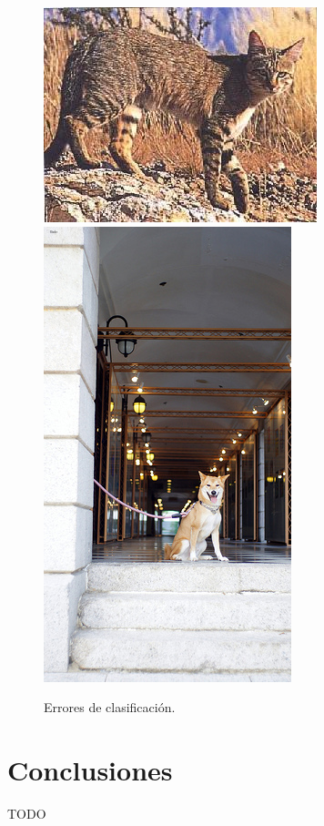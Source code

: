 \documentclass[12pt]{article}
\begin{document}
\begin{figure}[H]
    \centering
{\includegraphics[scale=0.5]{../no-dogs/eval/96.jpg}}
{\includegraphics[scale=1.5]{../dogs/eval/122.jpg}}
    \caption{Errores de clasificación.}
\end{figure}

\section{Conclusiones}
TODO






\end{document}
